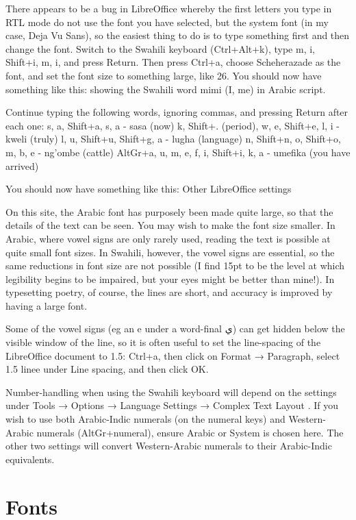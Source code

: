 \documentclass[a4paper,10pt]{article}
\begin{document}
There appears to be a bug in LibreOffice whereby the first letters you type in RTL mode do not use the font you have selected, but the system font (in my case, Deja Vu Sans), so the easiest thing to do is to type something first and then change the font. Switch to the Swahili keyboard (Ctrl+Alt+k), type m, i, Shift+i, m, i, and press Return. Then press Ctrl+a, choose Scheherazade as the font, and set the font size to something large, like 26. You should now have something like this:
showing the Swahili word mimi (I, me) in Arabic script.

Continue typing the following words, ignoring commas, and pressing Return after each one:
s, a, Shift+a, s, a - sasa (now)
k, Shift+. (period), w, e, Shift+e, l, i - kweli (truly)
l, u, Shift+u, Shift+g, a - lugha (language)
n, Shift+n, o, Shift+o, m, b, e - ng'ombe (cattle)
AltGr+a, u, m, e, f, i, Shift+i, k, a - umefika (you have arrived)

You should now have something like this:
Other LibreOffice settings

On this site, the Arabic font has purposely been made quite large, so that the details of the text can be seen. You may wish to make the font size smaller. In Arabic, where vowel signs are only rarely used, reading the text is possible at quite small font sizes. In Swahili, however, the vowel signs are essential, so the same reductions in font size are not possible (I find 15pt to be the level at which legibility begins to be impaired, but your eyes might be better than mine!). In typesetting poetry, of course, the lines are short, and accuracy is improved by having a large font.

Some of the vowel signs (eg an e under a word-final ي) can get hidden below the visible window of the line, so it is often useful to set the line-spacing of the LibreOffice document to 1.5: Ctrl+a, then click on Format → Paragraph, select 1.5 linee under Line spacing, and then click OK.

Number-handling when using the Swahili keyboard will depend on the settings under Tools → Options → Language Settings → Complex Text Layout . If you wish to use both Arabic-Indic numerals (on the numeral keys) and Western-Arabic numerals (AltGr+numeral), ensure Arabic or System is chosen here. The other two settings will convert Western-Arabic numerals to their Arabic-Indic equivalents.


\section{Fonts}
\end{document}

